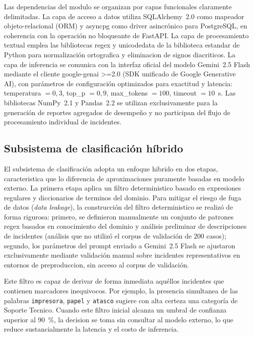 Las dependencias del modulo se organizan por capas funcionales claramente delimitadas. La capa de acceso a datos utiliza SQLAlchemy~2.0 como mapeador objeto-relacional (ORM) y asyncpg como driver asincrónico para PostgreSQL, en coherencia con la operación no bloqueante de FastAPI. La capa de procesamiento textual emplea las bibliotecas regex y unicodedata de la biblioteca estandar de Python para normalización ortografica y eliminacion de signos diacriticos. La capa de inferencia se comunica con la interfaz oficial del modelo Gemini~2.5 Flash mediante el cliente google-genai >=2.0 (SDK unificado de Google Generative AI), con parámetros de configuración optimizados para exactitud y latencia: temperatura \(= 0{,}3\), top\_p \(= 0{,}9\), max\_tokens \(= 100\), timeout \(= 10\)~s. Las bibliotecas NumPy~2.1 y Pandas~2.2 se utilizan exclusivamente para la generación de reportes agregados de desempeño y no participan del flujo de procesamiento individual de incidentes.

\subsection{Subsistema de clasificación híbrido}

El subsistema de clasificación adopta un enfoque hibrido en dos etapas, caracteristica que lo diferencia de aproximaciones puramente basadas en modelo externo. La primera etapa aplica un filtro deterministico basado en expresiones regulares y diccionarios de terminos del dominio. Para mitigar el riesgo de fuga de datos (\emph{data leakage}), la construcción del filtro deterministico se realizó de forma rigurosa: primero, se definieron manualmente un conjunto de patrones regex basados en conocimiento del dominio y análisis preliminar de descripciones de incidentes (análisis que no utilizó el corpus de validación de 200 casos); segundo, los parámetros del prompt enviado a Gemini~2.5 Flash se ajustaron exclusivamente mediante validación manual sobre incidentes representativos en entornos de preproduccion, sin acceso al corpus de validación.

Este filtro es capaz de derivar de forma inmediata aquéllos incidentes que contienen marcadores inequivocos. Por ejemplo, la presencia simultanea de las palabras \texttt{impresora}, \texttt{papel} y \texttt{atasco} sugiere con alta certeza una categoría de Soporte Tecnico. Cuando este filtro inicial alcanza un umbral de confianza superior al 90~\%, la decision se toma sin consultar al modelo externo, lo que reduce sustancialmente la latencia y el costo de inferencia.

